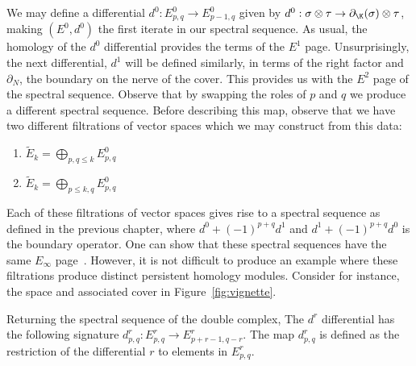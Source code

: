 We may define a differential $d^0: E^0_{p,q} \rightarrow E^0_{p-1,q}$ given by $d^0: \sigma \otimes \tau \rightarrow \partial_\K(\sigma) \otimes \tau$, making $(E^0, d^0)$ the first iterate in our spectral sequence. As usual, the homology of the $d^0$ differential provides the terms of the $E^1$ page. Unsurprisingly, the next differential, $d^1$ will be defined similarly, in terms of the right factor and $\partial_N$, the boundary on the nerve of the cover. This provides us with the $E^2$ page of the spectral sequence. Observe that by swapping the roles of $p$ and $q$ we produce a different spectral sequence.
Before describing this map, observe that we have two different filtrations of vector spaces which we may construct from this data: 
\begin{enumerate}
\item $\tilde{E}_k = \bigoplus_{p, q \leq k} E^0_{p,q}$
\item $\tilde{E}_k = \bigoplus_{p \leq k, q} E^0_{p,q}$ 
\end{enumerate}
Each of these filtrations of vector spaces gives rise to a spectral sequence as defined in the previous chapter, where $d^0 + (-1)^{p+q}d^1$ and $d^1 + (-1)^{p+q}d^0$ is the boundary operator. One can show that these spectral sequences have the same $E_\infty$ page~\cite{mcleary}. However, it is not difficult to produce an example where these filtrations produce distinct persistent homology modules. Consider for instance, the space and associated cover in Figure~\ref{fig:vignette}. 

Returning the spectral sequence of the double complex, The $d^r$ differential has the following signature $d^r_{p,q}: E^r_{p,q} \rightarrow E^r_{p+r-1, q-r}$. The map $d^r_{p,q}$ is defined as the restriction of the differential $r$ to elements in $E^r_{p,q}$. 

